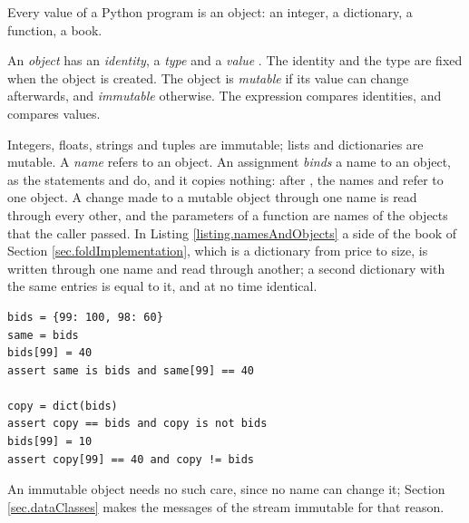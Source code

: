 Every value of a Python program is an object:
an integer, a dictionary, a function, a book.

\begin{defi}\label{def.object}
 An \emph{object} has an \emph{identity}, a \emph{type} and a \emph{value}
 \citep[Section 3.1]{PSF26lan}.
 The identity and the type are fixed when the object is created.
 The object is \emph{mutable} if its value can change afterwards,
 and \emph{immutable} otherwise.
 The expression  compares identities,
 and  compares values.
\end{defi}

Integers, floats, strings and tuples are immutable;
lists and dictionaries are mutable.
A \emph{name} refers to an object.
An assignment \emph{binds} a name to an object,
as the statements  and  do,
and it copies nothing:
after , the names  and  refer to one object.
A change made to a mutable object through one name is read through every other,
and the parameters of a function are names of the objects that the caller passed.
In Listing \ref{listing.namesAndObjects}
a side of the book of Section \ref{sec.foldImplementation},
which is a dictionary from price to size,
is written through one name and read through another;
a second dictionary with the same entries is equal to it, and at no time identical.

\begin{lstlisting}[caption={Two names of one dictionary, and two equal dictionaries.}, label=listing.namesAndObjects]
bids = {99: 100, 98: 60}
same = bids
bids[99] = 40
assert same is bids and same[99] == 40

copy = dict(bids)
assert copy == bids and copy is not bids
bids[99] = 10
assert copy[99] == 40 and copy != bids
\end{lstlisting}

An immutable object needs no such care, since no name can change it;
Section \ref{sec.dataClasses} makes the messages of the stream immutable for that reason.
